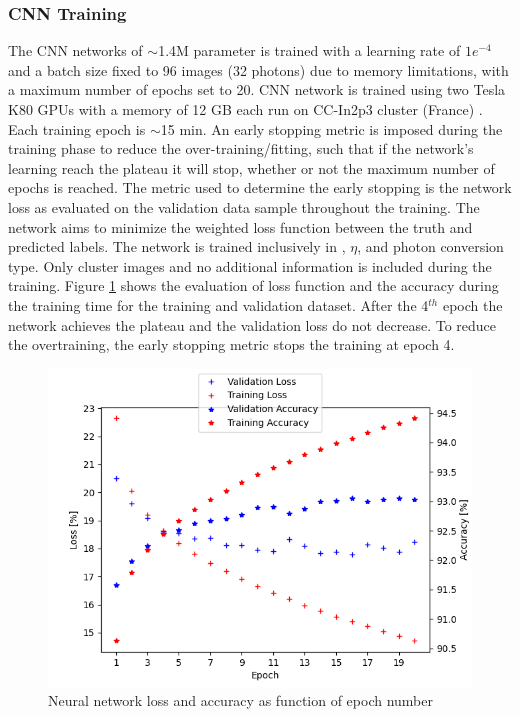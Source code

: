 \subsubsection{CNN Training}
\label{gamma:CNN:Training}
The CNN networks of $\sim$1.4M parameter is trained with a learning rate of $1e^{-4}$ and a batch size fixed to 96 images (32 photons) due to memory limitations, with a maximum number of epochs set to 20. CNN network is trained using two Tesla K80 GPUs with a memory of 12 GB each run on CC-In2p3 cluster (France) \cite{cca}. Each training epoch is $\sim$15 min. An early stopping metric \cite{early} is imposed during the training phase to reduce the over-training/fitting, such that if the network's learning reach the plateau it will stop, whether or not the maximum number of epochs is reached. The metric used to determine the early stopping is the network loss as evaluated on the validation data sample throughout the training. The network aims to minimize the weighted loss function between the truth and predicted labels.
The network is trained inclusively in \eT, $\eta$, and photon conversion type. Only cluster images and no additional information is included during the training.
Figure \ref{fig:gamma:CNN:Training:loss}  shows the evaluation of loss function and the accuracy during the training time for the training and validation dataset. After the 4$^{th}$ epoch the network achieves the plateau and the validation loss do not decrease. To reduce the overtraining, the early stopping metric stops the training at epoch 4.
\begin{figure}[H]
    \centering
    \includegraphics[width=.7\textwidth]{Ch3/Img/CNN_Loss_Accuracy.png}
    \caption{Neural network loss and accuracy as function of epoch number}
    \label{fig:gamma:CNN:Training:loss}
\end{figure}
